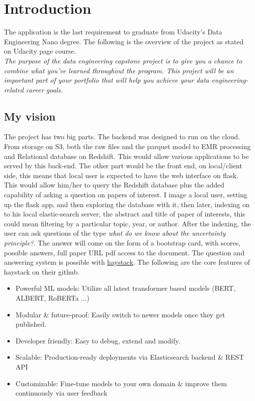 

\section{Introduction}

The application is the last requirement to graduate from Udacity's Data Engineering Nano degree. The following is
the overview of the project as stated on Udacity page course. \\

\emph{The purpose of the data engineering capstone project is to give you a chance to 
combine what you've learned throughout the program. This project will be an important part of 
your portfolio that will help you achieve your data engineering-related career goals.}


\subsection{My vision}
The project has two big parts. The backend was designed to run on the cloud. From storage on S3, both the raw files and the parquet model
to EMR processing and Relational database on Redshift. This would allow various applications to be served by this back-end. The other part would be
the front end, on local/client side, this means that local user is expected to have the web interface on flask. This would allow him/her to query
the Redshift database plus the added capability of asking a question on papers of interest. I image a local user, setting up the flask app, and then exploring the database with it, then later, indexing on to his local elastic-search server, the abstract and title of paper of interests, this could mean
filtering by a particular topic, year, or author. After the indexing, the user can ask questions of the type \emph{what do we know about the uncertainty principle?}. The answer will come on the form of a bootstrap card, with scores, possible answers, full paper URL pdf access to the document. The question and answering system is possible with \href{https://github.com/deepset-ai/haystack}{haystack}. The following are the core features of haystack on their github.




\begin{itemize}
\item Powerful ML models: Utilize all latest transformer based models (BERT, ALBERT, RoBERTa ...)
\item Modular \& future-proof: Easily switch to newer models once they get published.
\item Developer friendly: Easy to debug, extend and modify.
\item Scalable: Production-ready deployments via Elasticsearch backend \& REST API
\item Customizable: Fine-tune models to your own domain \& improve them continuously via user feedback
\end{itemize}


    
    
    
    


